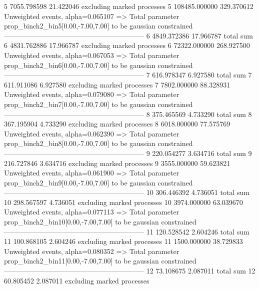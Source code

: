 5          7055.798598     21.422046       excluding marked processes    
5          108485.000000   329.370612      Unweighted events, alpha=0.065107
  => Total parameter prop_binch2_bin5[0.00,-7.00,7.00] to be gaussian constrained
------------------------------------------------------------
6          4849.372386     17.966787       total sum                     
6          4831.762886     17.966787       excluding marked processes    
6          72322.000000    268.927500      Unweighted events, alpha=0.067053
  => Total parameter prop_binch2_bin6[0.00,-7.00,7.00] to be gaussian constrained
------------------------------------------------------------
7          616.978347      6.927580        total sum                     
7          611.911086      6.927580        excluding marked processes    
7          7802.000000     88.328931       Unweighted events, alpha=0.079080
  => Total parameter prop_binch2_bin7[0.00,-7.00,7.00] to be gaussian constrained
------------------------------------------------------------
8          375.465569      4.733290        total sum                     
8          367.195904      4.733290        excluding marked processes    
8          6018.000000     77.575769       Unweighted events, alpha=0.062390
  => Total parameter prop_binch2_bin8[0.00,-7.00,7.00] to be gaussian constrained
------------------------------------------------------------
9          220.054277      3.634716        total sum                     
9          216.727846      3.634716        excluding marked processes    
9          3555.000000     59.623821       Unweighted events, alpha=0.061900
  => Total parameter prop_binch2_bin9[0.00,-7.00,7.00] to be gaussian constrained
------------------------------------------------------------
10         306.446392      4.736051        total sum                     
10         298.567597      4.736051        excluding marked processes    
10         3974.000000     63.039670       Unweighted events, alpha=0.077113
  => Total parameter prop_binch2_bin10[0.00,-7.00,7.00] to be gaussian constrained
------------------------------------------------------------
11         120.528542      2.604246        total sum                     
11         100.868105      2.604246        excluding marked processes    
11         1500.000000     38.729833       Unweighted events, alpha=0.080352
  => Total parameter prop_binch2_bin11[0.00,-7.00,7.00] to be gaussian constrained
------------------------------------------------------------
12         73.108675       2.087011        total sum                     
12         60.805452       2.087011        excluding marked processes    
